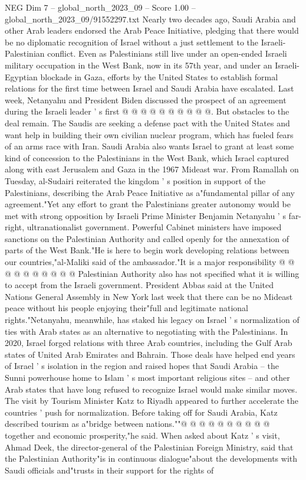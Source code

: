 \begin{textsample}{NEG Dim 7 – global\_north\_2023\_09 – Score 1.00 – global\_north\_2023\_09/91552297.txt}
Nearly two decades ago, Saudi Arabia and other Arab leaders endorsed the Arab Peace Initiative, pledging that there would be no diplomatic recognition of Israel without a just settlement to the Israeli-Palestinian conflict.
Even as Palestinians still live under an open-ended Israeli military occupation in the West Bank, now in its 57th year, and under an Israeli-Egyptian blockade in Gaza, efforts by the United States to establish formal relations for the first time between Israel and Saudi Arabia have escalated.
Last week, Netanyahu and President Biden discussed the prospect of an agreement during the Israeli leader ' s first @ @ @ @ @ @ @ @ @ @.
But obstacles to the deal remain.
The Saudis are seeking a defense pact with the United States and want help in building their own civilian nuclear program, which has fueled fears of an arms race with Iran.
Saudi Arabia also wants Israel to grant at least some kind of concession to the Palestinians in the West Bank, which Israel captured along with east Jerusalem and Gaza in the 1967 Mideast war.
From Ramallah on Tuesday, al-Sudairi reiterated the kingdom ' s position in support of the Palestinians, describing the Arab Peace Initiative as a"fundamental pillar of any agreement."Yet any effort to grant the Palestinians greater autonomy would be met with strong opposition by Israeli Prime Minister Benjamin Netanyahu ' s far-right, ultranationalist government.
Powerful Cabinet ministers have imposed sanctions on the Palestinian Authority and called openly for the annexation of parts of the West Bank."He is here to begin work developing relations between our countries,"al-Maliki said of the ambassador."It is a major responsibility @ @ @ @ @ @ @ @ @ @ Palestinian Authority also has not specified what it is willing to accept from the Israeli government.
President Abbas said at the United Nations General Assembly in New York last week that there can be no Mideast peace without his people enjoying their"full and legitimate national rights."Netanyahu, meanwhile, has staked his legacy on Israel ' s normalization of ties with Arab states as an alternative to negotiating with the Palestinians.
In 2020, Israel forged relations with three Arab countries, including the Gulf Arab states of United Arab Emirates and Bahrain.
Those deals have helped end years of Israel ' s isolation in the region and raised hopes that Saudi Arabia -- the Sunni powerhouse home to Islam ' s most important religious sites -- and other Arab states that have long refused to recognize Israel would make similar moves.
The visit by Tourism Minister Katz to Riyadh appeared to further accelerate the countries ' push for normalization.
Before taking off for Saudi Arabia, Katz described tourism as a"bridge between nations.""@ @ @ @ @ @ @ @ @ @ together and economic prosperity,"he said.
When asked about Katz ' s visit, Ahmad Deek, the director-general of the Palestinian Foreign Ministry, said that the Palestinian Authority"is in continuous dialogue"about the developments with Saudi officials and"trusts in their support for the rights of

\end{textsample}
